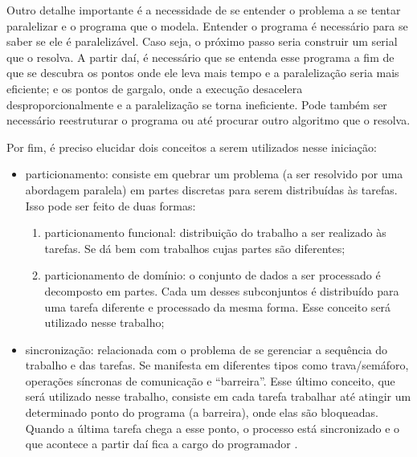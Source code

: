 Outro detalhe importante é a necessidade de se entender o problema a
se tentar paralelizar e o programa que o modela. Entender o programa
é necessário para se saber se ele é paralelizável. Caso seja, o
próximo passo seria construir um \gls{serial} que o resolva. A partir daí, é necessário
que se entenda esse programa a fim de que se descubra os pontos onde
ele leva mais tempo e a paralelização seria mais eficiente; e os
pontos de gargalo, onde a execução desacelera desproporcionalmente e a
paralelização se torna ineficiente. Pode também ser necessário
reestruturar o programa ou até procurar outro algoritmo que o resolva.

Por fim, é preciso elucidar dois conceitos a serem utilizados nesse
iniciação:
\begin{itemize}
	\item particionamento: consiste em quebrar um problema (a ser resolvido 
	      por uma abordagem paralela) em partes discretas para
	      serem distribuídas às tarefas. Isso pode ser feito de duas formas: 
	      \begin{enumerate}
	          \item particionamento funcional: distribuição do trabalho a
		            ser realizado às tarefas. Se dá bem com trabalhos cujas 
		            partes são diferentes;
		      \item particionamento de domínio: o conjunto de dados a ser
		            processado é decomposto em partes. Cada um desses subconjuntos é
		            distribuído para uma tarefa diferente e processado da mesma forma. 
		            Esse conceito será utilizado nesse trabalho;
	      \end{enumerate}
	\item sincronização: relacionada com o problema de se gerenciar
	      a sequência do trabalho e das tarefas. Se manifesta em diferentes
	      tipos como trava/semáforo, operações síncronas de comunicação e
	      ``barreira''. Esse último conceito, que será utilizado nesse
	      trabalho, consiste em cada tarefa trabalhar até atingir um
	      determinado ponto do programa (a barreira), onde elas são
	      bloqueadas. Quando a última tarefa chega a esse ponto, o processo
	      está sincronizado e o que acontece a partir daí fica a cargo do
	      programador \cite{LLNL:parcomp}.
\end{itemize}